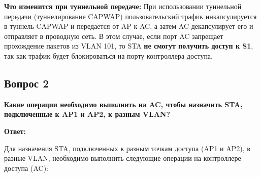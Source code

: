 \textbf{Что изменится при туннельной передаче:}
При использовании туннельной передачи (туннелирование CAPWAP) пользовательский трафик инкапсулируется в туннель CAPWAP и передается от AP к AC, а затем AC декапсулирует его и отправляет в проводную сеть. В этом случае, если порт AC запрещает прохождение пакетов из VLAN 101, то STA \textbf{не смогут получить доступ к S1}, так как трафик будет блокироваться на порту контроллера доступа.

\subsection*{Вопрос 2}
\textbf{Какие операции необходимо выполнить на AC, чтобы назначить STA, подключенные к AP1 и AP2, к разным VLAN?}

\textbf{Ответ:}

Для назначения STA, подключенных к разным точкам доступа (AP1 и AP2), в разные VLAN, необходимо выполнить следующие операции на контроллере доступа (AC):

